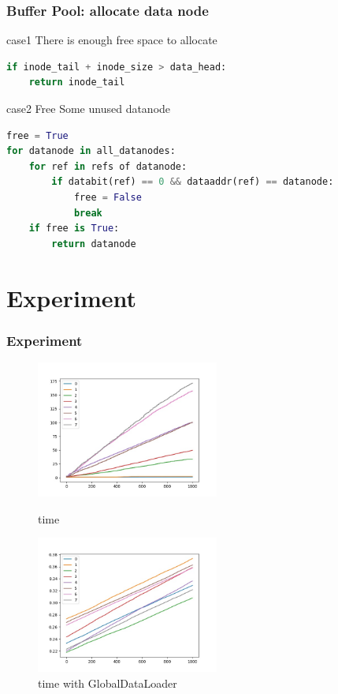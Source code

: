 \documentclass[notheorems, aspectratio=54]{beamer}
\begin{document}
\begin{frame}[fragile]
    \frametitle{Buffer Pool: allocate data node}
    \begin{block} {case1}
        There is enough free space to allocate
    \end{block}
    \begin{lstlisting}[language=python]
if inode_tail + inode_size > data_head:
    return inode_tail
    \end{lstlisting}

    \begin{block} {case2}
        Free Some unused datanode
    \end{block}
    \begin{lstlisting}[language=python]
free = True
for datanode in all_datanodes:
    for ref in refs of datanode:
        if databit(ref) == 0 && dataaddr(ref) == datanode:
            free = False
            break
    if free is True:
        return datanode
    \end{lstlisting}
\end{frame}
\section{Experiment}
\begin{frame}
    \frametitle{Experiment}
    \begin{figure}[htbp]
        \centering
        \begin{minipage}[t]{0.48\textwidth}
        \centering
        \includegraphics[width=6cm]{global_img_dir/l.jpg}
        \caption{time}
        \end{minipage}
        \begin{minipage}[t]{0.48\textwidth}
        \centering
        \includegraphics[width=6cm]{global_img_dir/gl.jpg}
        \caption{time with GlobalDataLoader}
        \end{minipage}
    \end{figure}
\end{frame}
\end{document}
